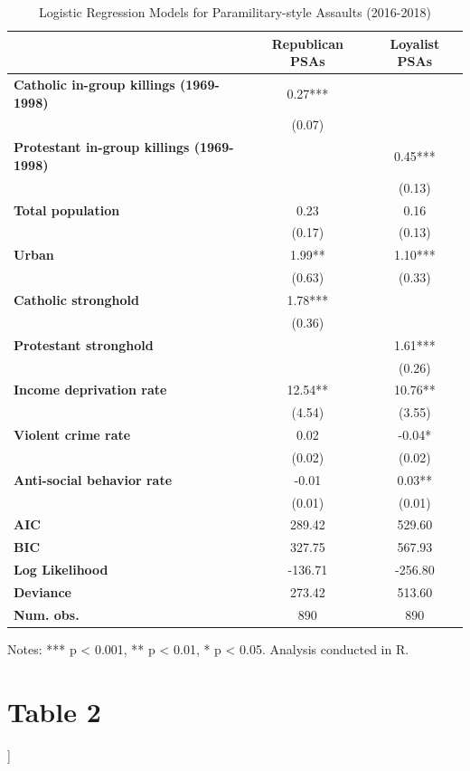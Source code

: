 \documentclass[12pt,letterpaper]{article}
\begin{document}
	\begin{table}[htbp]
		\centering
		\caption{Logistic Regression Models for Paramilitary-style Assaults (2016-2018)}
		\begin{tabular}{lcc}
			\toprule
			& \textbf{Republican PSAs} & \textbf{Loyalist PSAs} \\
			\midrule
			\textbf{Catholic in-group killings (1969-1998)} & 0.27*** & \\
			& (0.07) & \\
			\textbf{Protestant in-group killings (1969-1998)} & & 0.45*** \\
			& & (0.13) \\
			\textbf{Total population} & 0.23 & 0.16 \\
			& (0.17) & (0.13) \\
			\textbf{Urban} & 1.99** & 1.10*** \\
			& (0.63) & (0.33) \\
			\textbf{Catholic stronghold} & 1.78*** & \\
			& (0.36) & \\
			\textbf{Protestant stronghold} & & 1.61*** \\
			& & (0.26) \\
			\textbf{Income deprivation rate} & 12.54** & 10.76** \\
			& (4.54) & (3.55) \\
			\textbf{Violent crime rate} & 0.02 & -0.04* \\
			& (0.02) & (0.02) \\
			\textbf{Anti-social behavior rate} & -0.01 & 0.03** \\
			& (0.01) & (0.01) \\
			\midrule
			\textbf{AIC} & 289.42 & 529.60 \\
			\textbf{BIC} & 327.75 & 567.93 \\
			\textbf{Log Likelihood} & -136.71 & -256.80 \\
			\textbf{Deviance} & 273.42 & 513.60 \\
			\textbf{Num. obs.} & 890 & 890 \\
			\bottomrule
		\end{tabular}
		\label{tab:logistic_regression}
		\medskip
		\small
		\raggedright
		Notes: *** p < 0.001, ** p < 0.01, * p < 0.05. Analysis conducted in R.
	\end{table}
	\newpage
\section*{Table 2}
	]
	
\end{document}
